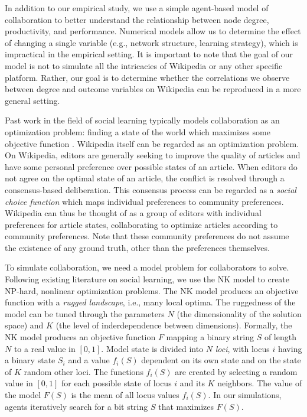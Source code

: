 In addition to our empirical study,
we use a simple agent-based model of collaboration to better understand
the relationship between node degree, productivity, and performance.
Numerical models allow us to determine the effect of changing a single
variable (e.g., network structure, learning strategy),
which is impractical in the empirical setting.
It is important to note that the goal of our model is not to simulate
all the intricacies of Wikipedia or any other specific platform.
Rather, our goal is to determine whether the correlations we observe
between degree and outcome variables
on Wikipedia can be reproduced in a more general setting.

Past work in the field of social learning typically models collaboration
as an optimization problem:
finding a state of the world which maximizes some objective function
\cite{lazer_network_2007,mason_propagation_2008,mason_collaborative_2012,barkoczi_social_2016}.
Wikipedia itself can be regarded as an optimization problem.
On Wikipedia, editors are generally seeking to improve the quality of articles
and have some personal preference over possible states of an article.
When editors do not agree on the optimal state of an article,
the conflict is resolved through a consensus-based deliberation.
This consensus process can be regarded as a {\em social choice function}
\cite{arrow_social_2012,brandt_computational_2012}
which maps individual preferences to community preferences.
Wikipedia can thus be thought of as a group of editors with individual preferences
for article states,
collaborating to optimize articles according to community preferences.
Note that these community preferences do not assume the existence of any
ground truth, other than the preferences themselves.

To simulate collaboration, we need a model problem for collaborators to solve.
Following existing literature on social learning,
we use the NK model \cite{kauffman_towards_1987}
to create NP-hard, nonlinear optimization problems.
The NK model produces an objective function with a
{\em rugged landscape}, i.e., many local optima.
The ruggedness of the model can be tuned through the parameters $N$
(the dimensionality of the solution space)
and $K$ (the level of inderdependence between dimensions).
Formally, the NK model produces an objective function $F$ mapping a binary string $S$ of length
$N$ to a real value in $[0,1]$.
Model state is divided into $N$ {\em loci}, with locus $i$ having a binary state $S_i$
and a value $f_i(S)$ dependent on its own state
and on the state of $K$ random other loci.
The functions $f_i(S)$ are created by selecting a random value in $[0,1]$ for
each possible state of locus $i$ and its $K$ neighbors.
The value of the model $F(S)$ is the mean of all locus values $f_i(S)$.
In our simulations,
agents iteratively search for a bit string $S$ that maximizes $F(S)$.

